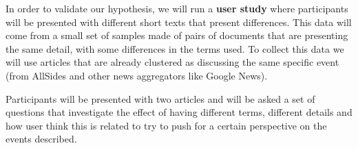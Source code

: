 




In order to validate our hypothesis, we will run a \textbf{user study} where participants will be presented with different short texts that present differences.
This data will come from a small set of samples made of pairs of documents that are presenting the same detail, with some differences in the terms used. To collect this data we will use articles that are already clustered as discussing the same specific event (from AllSides and other news aggregators like Google News).

Participants will be presented with two articles and will be asked a set of questions that investigate the effect of having different terms, different details and how user think this is related to try to push for a certain perspective on the events described.

